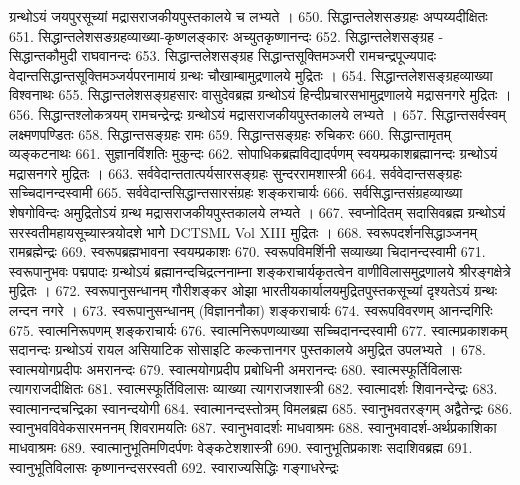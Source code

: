 		ग्रन्थोऽयं जयपुरसूच्यां मद्रासराजकीयपुस्तकालये च लभ्यते । 
650. सिद्धान्तलेशसङग्रहः 					अप्पय्यदीक्षितः
651. सिद्धान्तलेशसङग्रहव्याख्या-कृष्णलङ्कारः अच्युतकृष्णानन्दः
652. सिद्धान्तलेशसङ्ग्रह - सिद्धान्तकौमुदी राघवानन्दः
653. सिद्धान्तलेशसङ्ग्रह सिद्धान्तसूक्तिमञ्जरी रामचन्द्रपूज्यपादः
		वेदान्तसिद्धान्तसूक्तिमञ्जर्यपरनामायं ग्रन्थः चौखाम्बामुद्रणालये मुद्रितः । 
654. सिद्धान्तलेशसङ्ग्रहव्याख्या			विश्वनाथः
655. सिद्धान्तलेशसङ्ग्रहसारः				वासुदेवब्रह्म 
		ग्रन्थोऽयं हिन्दीप्रचारसभामुद्रणालये मद्रासनगरे मुद्रितः ।
656. सिद्धान्तश्लोकत्रयम् 					रामचन्द्रेन्द्रः 
		ग्रन्थोऽयं मद्रासराजकीयपुस्तकालये लभ्यते । 
657. सिद्धान्तसर्वस्वम् 						लक्ष्मणपण्डितः
658. सिद्धान्तसङ्ग्रहः						रामः
659. सिद्धान्तसङ्ग्रहः						रुचिकरः 
660. सिद्धान्तामृतम् 						व्यङ्कटनाथः
661. सुज्ञानविंशतिः							मुकुन्दः
662. सोपाधिकब्रह्मविद्यादर्पणम् 			स्वयम्प्रकाशब्रह्मानन्दः
		ग्रन्थोऽयं मद्रासनगरे मुद्रितः ।
663. सर्ववेदान्ततात्पर्यसारसङ्ग्रहः			सुन्दररामशास्त्री
664. सर्ववेदान्तसङ्ग्रहः						सच्चिदानन्दस्वामी
665. सर्ववेदान्तसिद्धान्तसारसंग्रहः 		शङ्कराचार्यः 
666. सर्वसिद्धान्तसंग्रहव्याख्या				शेषगोविन्दः
		अमुद्रितोऽयं ग्रन्थ मद्रासराजकीयपुस्तकालये लभ्यते । 
667. स्वप्नोदितम् 							सदासिवब्रह्म
		ग्रन्थोऽयं सरस्वतीमहायसूच्यास्त्रयोदशे भागेे DCTSML Vol XIII मुद्रितः । 
668. स्वरूपदर्शनसिद्धाञ्जनम् 				रामब्रह्मेन्द्रः
669. स्वरूपब्रह्मभावना						स्वयम्प्रकाशः
670. स्वरूपविमर्शिनी सव्याख्या			चिदानन्दस्वामी
671. स्वरूपानुभवः							पद्मपादः
		ग्रन्थोऽयं ब्रह्मानन्दचिद्रत्ननाम्ना शङ्कराचार्यकृतत्वेन वाणीविलासमुद्रणालये श्रीरङ्गक्षेत्रे मुद्रितः । 
672. स्वरूपानुसन्धानम्					गौरीशङ्कर ओझा 
		भारतीयकार्यालयमुद्रितपुस्तकसूच्यां दृश्यतेऽयं ग्रन्थः लन्दन नगरे । 
673. स्वरूपानुसन्धानम् (विज्ञाननौका)	शङ्कराचार्यः
674. स्वरूपविवरणम् 						आनन्दगिरिः
675. स्वात्मनिरूपणम् 						शङ्कराचार्यः
676. स्वात्मनिरूपणव्याख्या				सच्चिदानन्दस्वामी
677. स्वात्मप्रकाशकम् 						सदानन्दः
		ग्रन्थोऽयं रायल असियाटिक सोसाइटि कल्कत्तानगर पुस्तकालये अमुद्रित उपलभ्यते । 
678. स्वात्मयोगप्रदीपः						अमरानन्दः
679. स्वात्मयोगप्रदीप प्रबोधिनी			अमरानन्दः
680. स्वात्मस्फूर्तिविलासः					त्यागराजदीक्षितः
681. स्वात्मस्फूर्तिविलासः व्याख्या			त्यागराजशास्त्री
682. स्वात्मादर्शः							शिवानन्देन्द्रः
683. स्वात्मानन्दचन्द्रिका					स्वानन्दयोगी
684. स्वात्मानन्दस्तोत्रम् 					विमलब्रह्म
685. स्वानुभवतरङ्गम् 						अद्वैतेन्द्रः
686. स्वानुभवविवेकसारमननम्			शिवरामयतिः 
687. स्वानुभवादर्शः							माधवाश्रमः
688. स्वानुभवादर्श-अर्थप्रकाशिका			माधवाश्रमः
689. स्वात्मानुभूतिमणिदर्पणः				वेङ्कटेशशास्त्री
690. स्वानुभूतिप्रकाशः						सदाशिवब्रह्म
691. स्वानुभूतिविलासः						कृष्णानन्दसरस्वती
692. स्वाराज्यसिद्धिः						गङ्गाधरेन्द्रः
